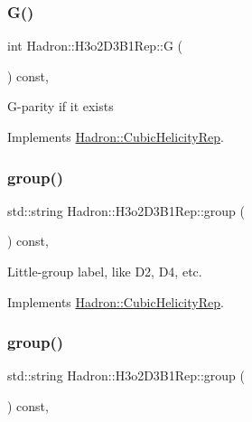 \subsubsection{\texorpdfstring{G()}{G()}\hspace{0.1cm}{\footnotesize\ttfamily [3/3]}}
{\footnotesize\ttfamily int Hadron\+::\+H3o2\+D3\+B1\+Rep\+::G (\begin{DoxyParamCaption}{ }\end{DoxyParamCaption}) const\hspace{0.3cm}{\ttfamily [inline]}, {\ttfamily [virtual]}}

G-\/parity if it exists 

Implements \mbox{\hyperlink{structHadron_1_1CubicHelicityRep_a50689f42be1e6170aa8cf6ad0597018b}{Hadron\+::\+Cubic\+Helicity\+Rep}}.

\mbox{\label{structHadron_1_1H3o2D3B1Rep_a0839d8685752d851d9175eb3cfb568d7}} 
\subsubsection{\texorpdfstring{group()}{group()}\hspace{0.1cm}{\footnotesize\ttfamily [1/5]}}
{\footnotesize\ttfamily std\+::string Hadron\+::\+H3o2\+D3\+B1\+Rep\+::group (\begin{DoxyParamCaption}{ }\end{DoxyParamCaption}) const\hspace{0.3cm}{\ttfamily [inline]}, {\ttfamily [virtual]}}

Little-\/group label, like D2, D4, etc. 

Implements \mbox{\hyperlink{structHadron_1_1CubicHelicityRep_a101a7d76cd8ccdad0f272db44b766113}{Hadron\+::\+Cubic\+Helicity\+Rep}}.

\mbox{\label{structHadron_1_1H3o2D3B1Rep_a0839d8685752d851d9175eb3cfb568d7}} 
\subsubsection{\texorpdfstring{group()}{group()}\hspace{0.1cm}{\footnotesize\ttfamily [2/5]}}
{\footnotesize\ttfamily std\+::string Hadron\+::\+H3o2\+D3\+B1\+Rep\+::group (\begin{DoxyParamCaption}{ }\end{DoxyParamCaption}) const\hspace{0.3cm}{\ttfamily [inline]}, {\ttfamily [virtual]}}

